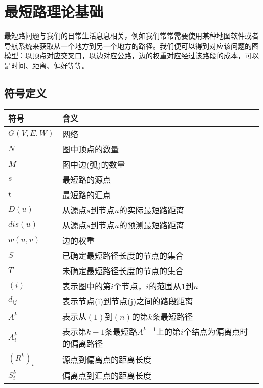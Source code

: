 \let\cleardoublepage\clearpage


\chapter{最短路理论基础}\label{ch:最短路理论基础}
最短路问题与我们的日常生活息息相关，例如我们常常需要使用某种地图软件或者导航系统来获取从一个地方到另一个地方的路径。我们便可以得到对应该问题的图模型：以顶点对应交叉口，以边对应公路，边的权重对应经过该路段的成本，可以是时间、距离、偏好等等。


\section{符号定义}\label{sec:符号定义}
\begin{center}
    \begin{tabular}{l l}%
        \hline
        符号         & 含义                                       \\
        \hline%
        $G(V,E,W)$ & 网络                                       \\
        $N$        & 图中顶点的数量                                  \\
        $M$        & 图中边(弧)的数量                                \\
        $s$        & 最短路的源点                                   \\
        $t$        & 最短路的汇点                                   \\
        $D(u)$     & 从源点$s$到节点$u$的实际最短路距离                     \\
        $dis(u)$   & 从源点$s$到节点$u$的预测最短路距离                     \\
        $w(u,v)$   & 边的权重                                     \\
        $S$        & 已确定最短路径长度的节点的集合                          \\
        $T$        & 未确定最短路径长度的节点的集合                          \\
        $(i)$      & 表示图中的第$i$个节点，$i$的范围从$1$到$n$              \\
        $d_{ij}$   & 表示节点(i)到节点(j)之间的路段距离                     \\
        $A^k$      & 表示从$(1)$到$(n)$的第$k$条最短路径                 \\
        $A^k_i$    & 表示第$k-1$条最短路$A^{k-1}$上的第$i$个结点为偏离点时的偏离路径 \\
        $(R^k)_i$  & 源点到偏离点的距离长度                              \\
        $S^k_i$    & 偏离点到汇点的距离长度                              \\
        \hline
    \end{tabular}
\end{center}


